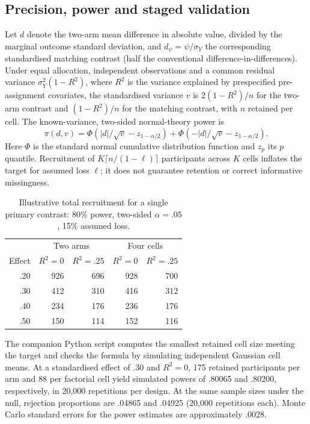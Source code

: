 \subsection{Precision, power and staged validation}
Let $d$ denote the two-arm mean difference in absolute value, divided by the marginal outcome standard deviation, and $d_\psi=\psi/\sigma_Y$ the corresponding standardised matching contrast (half the conventional difference-in-differences). Under equal allocation, independent observations and a common residual variance $\sigma_Y^2(1-R^2)$, where $R^2$ is the variance explained by prespecified pre-assignment covariates, the standardised variance $v$ is $2(1-R^2)/n$ for the two-arm contrast and $(1-R^2)/n$ for the matching contrast, with $n$ retained per cell. The known-variance, two-sided normal-theory power is
\[
\pi(d,v)=\Phi(|d|/\sqrt{v}-z_{1-\alpha/2})
+\Phi(-|d|/\sqrt{v}-z_{1-\alpha/2}).
\]
Here $\Phi$ is the standard normal cumulative distribution function and $z_p$ its $p$ quantile. Recruitment of $K\lceil n/(1-\ell)\rceil$ participants across $K$ cells inflates the target for assumed loss $\ell$; it does not guarantee retention or correct informative missingness.

\begin{table}[htbp]
\centering\small
\caption{Illustrative total recruitment for a single primary contrast: 80\% power, two-sided $\alpha=.05$, 15\% assumed loss.}
\label{tab:power}
\begin{tabular}{@{}rrrrr@{}}
\toprule
&\multicolumn{2}{c}{Two arms}&\multicolumn{2}{c}{Four cells}\\
Effect & $R^2=0$ & $R^2=.25$ & $R^2=0$ & $R^2=.25$\\
\midrule
.20 & 926 & 696 & 928 & 700\\
.30 & 412 & 310 & 416 & 312\\
.40 & 234 & 176 & 236 & 176\\
.50 & 150 & 114 & 152 & 116\\
\bottomrule
\end{tabular}
\end{table}

The companion Python script computes the smallest retained cell size meeting the target and checks the formula by simulating independent Gaussian cell means. At a standardised effect of .30 and $R^2=0$, 175 retained participants per arm and 88 per factorial cell yield simulated powers of .80065 and .80200, respectively, in 20,000 repetitions per design. At the same sample sizes under the null, rejection proportions are .04865 and .04925 (20,000 repetitions each). Monte Carlo standard errors for the power estimates are approximately .0028.

